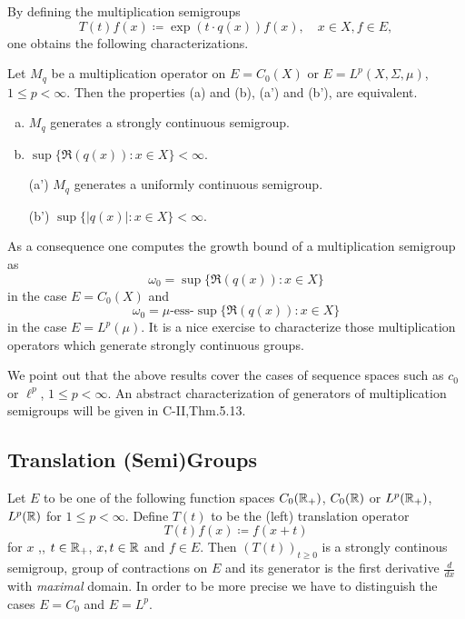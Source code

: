 By defining the multiplication semigroups
\[
    T(t)f(x) \coloneqq \exp(t \cdot q(x))f(x), \quad x \in X, f \in E,
\]
one obtains the following characterizations.
\begin{proposition}\label{prop:a1-2.3}
Let $M_{q}$ be a multiplication operator on $E = C_{0}(X)$ or $E = L^{p}(X,\Sigma,\mu)$, $1 \leq p < \infty$.
Then the properties (a) and (b), \resp (a') and (b'), are equivalent.
\begin{enumerate}[(a)]
\item 
	$M_{q}$ generates a strongly continuous semigroup.

\item 
	$\sup\{\Re( q(x)) \colon x \in X \} < \infty$.

\item[(a')] 
	$M_{q}$ generates a uniformly continuous semigroup.

\item[(b')] 
	$\sup\{|q(x)| \colon x \in X \} < \infty$.
\end{enumerate}
\end{proposition}
As a consequence one computes the growth bound of a multiplication semigroup as
\[
    \omega_{0} = \sup\{\Re(q(x)) \colon x \in X\} 
\]
in the case $E = C_{0}(X)$ and 
\[
    \omega_{0} = \mu\text{-ess-}\sup\{\Re(q(x)) \colon x \in X\} 
\]
in the case  $E = L^{p}(\mu)$.
It is a nice exercise to characterize those multiplication operators which generate strongly continuous groups.

We point out that the above results cover the cases of sequence spaces such as $c_{0}$ or $\ell^{p}$, $1 \leq p < \infty$.
An abstract characterization of generators of multiplication semigroups will be given in C-II,Thm.5.13.
\subsection{Translation (Semi)Groups}\label{subsec:a1-2.4}
Let $E$ to be one of the following function spaces $C_{0}(\mathbb{R}_{+})$, $C_{0}(\mathbb{R})$ or $L^{p}(\mathbb{R}_{+})$, $L^{p}(\mathbb{R})$ for $1 \leq p < \infty$.
Define $T(t)$ to be the (left) translation operator
\[
    T(t)f(x) \coloneqq f(x+t)
\]
for $x$ ,, $ t \in \mathbb{R}_{+}$, \resp $x, t \in \mathbb{R}$ and $f \in E$.
Then $(T(t))_{t \geq 0}$ is a strongly continous semigroup, \resp group of contractions on $E$ and its generator is the first derivative $\frac{d}{dx}$ with \emph{maximal} domain.
In order to be more precise we have to distinguish the cases $E = C_{0}$ and $E = L^{p}$.

